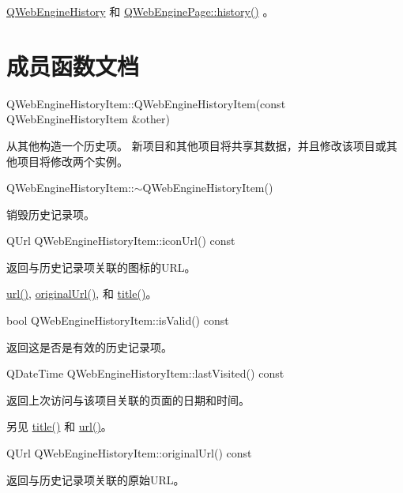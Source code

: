 \begin{notice}[另请参阅]
 \href{https://github.com/QtDocumentCN/QtDocumentCN/blob/master/Src/W/QWebEngineHistoryItem/qwebenginehistory.html}{QWebEngineHistory} 和 \href{https://github.com/QtDocumentCN/QtDocumentCN/blob/master/Src/W/QWebEngineHistoryItem/qwebenginepage.html#history}{QWebEnginePage::history()} 。
\end{notice}


\section{成员函数文档}

QWebEngineHistoryItem::QWebEngineHistoryItem(const QWebEngineHistoryItem \&other)

从其他构造一个历史项。 新项目和其他项目将共享其数据，并且修改该项目或其他项目将修改两个实例。

QWebEngineHistoryItem::$\sim$QWebEngineHistoryItem()

销毁历史记录项。

QUrl QWebEngineHistoryItem::iconUrl() const

返回与历史记录项关联的图标的URL。

\begin{notice}[另请参阅]
	\href{https://github.com/QtDocumentCN/QtDocumentCN/blob/master/Src/W/QWebEngineHistoryItem/qwebenginehistoryitem.html#url}{url()}, \href{https://github.com/QtDocumentCN/QtDocumentCN/blob/master/Src/W/QWebEngineHistoryItem/qwebenginehistoryitem.html#originalUrl}{originalUrl()}, 和 \href{https://github.com/QtDocumentCN/QtDocumentCN/blob/master/Src/W/QWebEngineHistoryItem/qwebenginehistoryitem.html#title}{title()}。
\end{notice}


bool QWebEngineHistoryItem::isValid() const

返回这是否是有效的历史记录项。

QDateTime QWebEngineHistoryItem::lastVisited() const

返回上次访问与该项目关联的页面的日期和时间。

另见 \href{https://github.com/QtDocumentCN/QtDocumentCN/blob/master/Src/W/QWebEngineHistoryItem/qwebenginehistoryitem.html#title}{title()} 和 \href{https://github.com/QtDocumentCN/QtDocumentCN/blob/master/Src/W/QWebEngineHistoryItem/qwebenginehistoryitem.html#url}{url()}。

QUrl QWebEngineHistoryItem::originalUrl() const

返回与历史记录项关联的原始URL。

